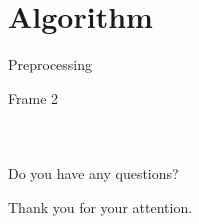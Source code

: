 \documentclass{beamer}
\begin{document}
\section{Algorithm}
\begin{frame}{Preprocessing}

\end{frame}

\begin{frame}

\end{frame}



\begin{frame}{Frame 2}
\begin{columns}
\begin{figure}
		\centering
		\hspace*{-0.5cm}%
	\end{figure}

\end{columns}
\end{frame}


\begin{frame}
\centering
\huge{Do you have any questions?}\\
\pause
\vspace*{1.5cm}
\centerline{\large{Thank you for your attention.}}
\end{frame}
\end{document}
